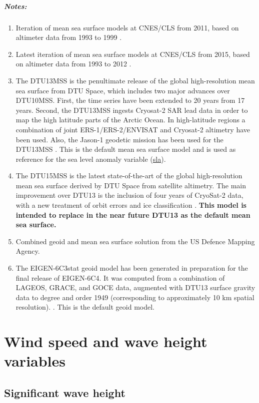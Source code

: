 \documentclass[a4paper,11pt,openany,natbib,nomargin]{thesis}
\makeatletter
\newcommand\var[1]{\url{#1}\index{variables!#1@\protect\url{#1}}}
\newenvironment{notes}[1][Notes:]{\FloatBarrier\paragraph{#1}\begin{enumerate}}{\end{enumerate}}
\makeatother
\begin{document}
\begin{notes}
\item Iteration of mean sea surface models at CNES/CLS from 2011, based on altimeter data from 1993 to 1999 \citep{schaeffer2012}.\label{item:mss_cnescls11}
\item Latest iteration of mean sea surface models at CNES/CLS from 2015, based on altimeter data from 1993 to 2012 \citep{schaeffer2012}.\label{item:mss_cnescls15}
\item The DTU13MSS is the penultimate release of the global high-resolution mean sea surface from DTU Space, which includes two major advances over DTU10MSS. First, the time series have been extended to 20 years from 17 years. Second, the DTU13MSS ingests Cryosat-2 SAR lead data in order to map the high latitude parts of the Arctic Ocean. In high-latitude regions a combination of joint ERS-1/ERS-2/ENVISAT and Cryosat-2 altimetry have been used. Also, the Jason-1 geodetic mission has been used for the DTU13MSS \citep{andersen2013a}. This is the default mean sea surface model and is used as reference for the sea level anomaly variable (\var{sla}).\label{item:mss_dtu13}
\item The DTU15MSS is the latest state-of-the-art of the global high-resolution mean sea surface derived by DTU Space from satellite altimetry. The main improvement over DTU13 is the inclusion of four years of CryoSat-2 data, with a new treatment of orbit errors and ice classification \citep{stenseng2015}.
\textbf{This model is intended to replace in the near future DTU13 as the default mean sea surface.}\label{item:mss_dtu15}
\item Combined geoid and mean sea surface solution from the US Defence Mapping Agency\citep{pavlis2012}.
\label{item:geoid_egm2008}
\item The EIGEN-6C3stat geoid model has been generated in preparation for the final release of EIGEN-6C4. It was computed from a combination of LAGEOS, GRACE, and GOCE data, augmented with DTU13 surface gravity data to degree and order 1949 (corresponding to approximately 10 km spatial resolution). \citep{foerste2013,shako2014}. This is the default geoid model.\label{item:geoid_eigen6}
\end{notes}

\chapter{Wind speed and wave height variables}
\section{Significant wave height}
\label{var:swh}
\end{document}
